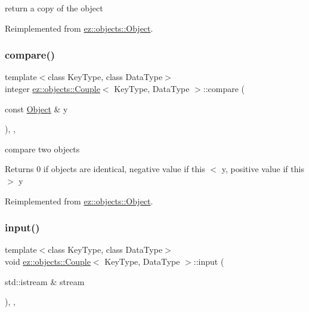 return a copy of the object 

Reimplemented from \hyperlink{classez_1_1objects_1_1Object_acf444b2581d898eb4b8c92c2d5865c9e}{ez\+::objects\+::\+Object}.

\mbox{\label{classez_1_1objects_1_1Couple_a0f4afb11f854f2e84fd2d413cd08212e}} 
\subsubsection{\texorpdfstring{compare()}{compare()}}
{\footnotesize\ttfamily template$<$class Key\+Type, class Data\+Type$>$ \\
integer \hyperlink{classez_1_1objects_1_1Couple}{ez\+::objects\+::\+Couple}$<$ Key\+Type, Data\+Type $>$\+::compare (\begin{DoxyParamCaption}\item[{const \hyperlink{classez_1_1objects_1_1Object}{Object} \&}]{y }\end{DoxyParamCaption})\hspace{0.3cm}{\ttfamily [inline]}, {\ttfamily [override]}, {\ttfamily [virtual]}}

compare two objects \begin{DoxyReturn}{Returns}
0 if objects are identical, negative value if this $<$ y, positive value if this $>$ y 
\end{DoxyReturn}


Reimplemented from \hyperlink{classez_1_1objects_1_1Object_aca311d389dffa204e425463145f4e1e6}{ez\+::objects\+::\+Object}.

\mbox{\label{classez_1_1objects_1_1Couple_a4f7228308e803711bd6866c367e18d06}} 
\subsubsection{\texorpdfstring{input()}{input()}}
{\footnotesize\ttfamily template$<$class Key\+Type, class Data\+Type$>$ \\
void \hyperlink{classez_1_1objects_1_1Couple}{ez\+::objects\+::\+Couple}$<$ Key\+Type, Data\+Type $>$\+::input (\begin{DoxyParamCaption}\item[{std\+::istream \&}]{stream }\end{DoxyParamCaption})\hspace{0.3cm}{\ttfamily [inline]}, {\ttfamily [override]}, {\ttfamily [virtual]}}

